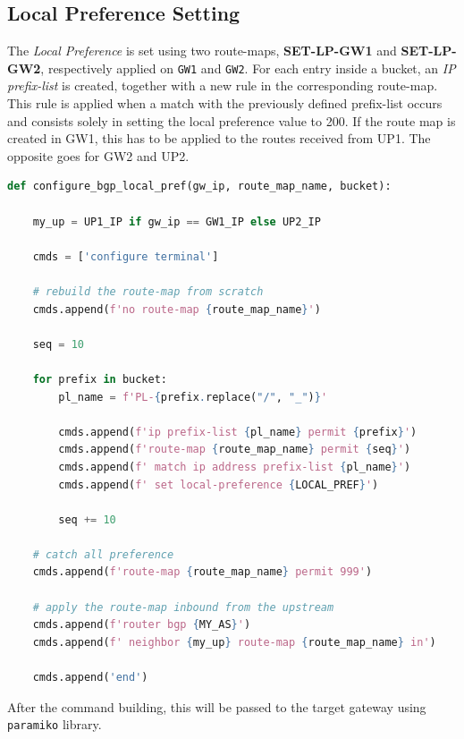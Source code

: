 \documentclass{report}
\begin{document}
\subsection{Local Preference Setting}
The \textit{Local Preference} is set using two route-maps, \textbf{SET-LP-GW1} and \textbf{SET-LP-GW2}, respectively applied on \texttt{GW1} and \texttt{GW2}.
For each entry inside a bucket, an \textit{IP prefix-list} is created, together with a new rule in the corresponding route-map.
This rule is applied when a match with the previously defined prefix-list occurs and consists solely in setting the local preference value to 200.
If the route map is created in GW1, this has to be applied to the routes received from UP1. The opposite goes for GW2 and UP2.
\begin{lstlisting}[language=Python, style=stylePython, caption=Local Preference Route Map Creation, label=lst:LP-ROUTEMAP-CREATION]
def configure_bgp_local_pref(gw_ip, route_map_name, bucket):

    my_up = UP1_IP if gw_ip == GW1_IP else UP2_IP

    cmds = ['configure terminal']

    # rebuild the route-map from scratch
    cmds.append(f'no route-map {route_map_name}')

    seq = 10

    for prefix in bucket:
        pl_name = f'PL-{prefix.replace("/", "_")}'

        cmds.append(f'ip prefix-list {pl_name} permit {prefix}')
        cmds.append(f'route-map {route_map_name} permit {seq}')
        cmds.append(f' match ip address prefix-list {pl_name}')
        cmds.append(f' set local-preference {LOCAL_PREF}')

        seq += 10

    # catch all preference
    cmds.append(f'route-map {route_map_name} permit 999')

    # apply the route-map inbound from the upstream
    cmds.append(f'router bgp {MY_AS}')
    cmds.append(f' neighbor {my_up} route-map {route_map_name} in')

    cmds.append('end')
\end{lstlisting}
After the command building, this will be passed to the target gateway using \texttt{paramiko} library.
\end{document}
